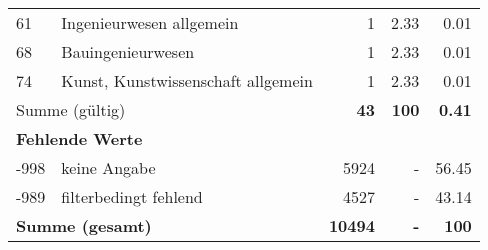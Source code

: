 \begin{longtable}{lXrrr}
        61 & \multicolumn{1}{X}{Ingenieurwesen allgemein} & %
          \num{1} &
          \num[round-mode=places,round-precision=2]{2.33} &
          \num[round-mode=places,round-precision=2]{0.01} \\

        68 & \multicolumn{1}{X}{Bauingenieurwesen} & %
          \num{1} &
          \num[round-mode=places,round-precision=2]{2.33} &
          \num[round-mode=places,round-precision=2]{0.01} \\

        74 & \multicolumn{1}{X}{Kunst, Kunstwissenschaft allgemein} & %
          \num{1} &
          \num[round-mode=places,round-precision=2]{2.33} &
          \num[round-mode=places,round-precision=2]{0.01} \\

     \midrule
     \multicolumn{2}{l}{Summe (gültig)} &
       \textbf{\num{43}} &
     \textbf{\num{100}} &
       \textbf{\num[round-mode=places,round-precision=2]{0.41}} \\
     \multicolumn{5}{l}{\textbf{Fehlende Werte}}\\
       -998 &
       keine Angabe &
         \num{5924} &
        - &
         \num[round-mode=places,round-precision=2]{56.45} \\
       -989 &
       filterbedingt fehlend &
         \num{4527} &
        - &
         \num[round-mode=places,round-precision=2]{43.14} \\
     \midrule
     \multicolumn{2}{l}{\textbf{Summe (gesamt)}} &
          \textbf{\num{10494}} &
        \textbf{-} &
        \textbf{\num{100}} \\
     \bottomrule
     \end{longtable}
     
